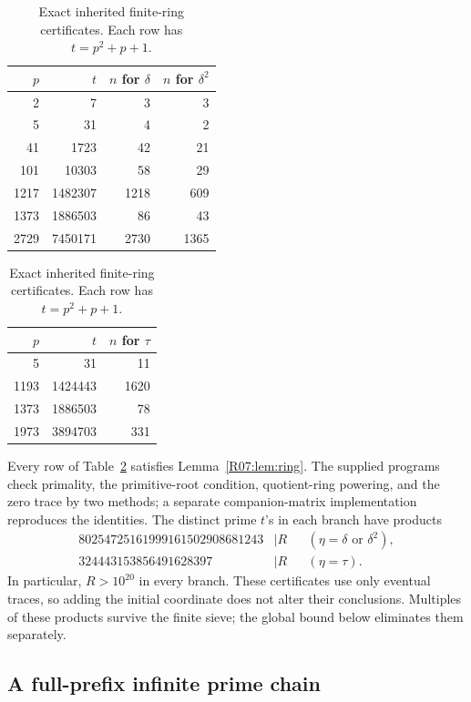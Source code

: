 \documentclass[11pt,a4paper]{article}
\theoremstyle{definition}\newtheorem{definition}[theorem]{Definition}
\theoremstyle{remark}\newtheorem{remark}[theorem]{Remark}
\begin{document}
\begin{table}[htbp]
\centering
\begin{tabular}{rrrr}
\toprule
$p$ & $t$ & $n$ for $\delta$ & $n$ for $\delta^2$\\
\midrule
2 & 7 & 3 & 3\\
5 & 31 & 4 & 2\\
41 & 1723 & 42 & 21\\
101 & 10303 & 58 & 29\\
1217 & 1482307 & 1218 & 609\\
1373 & 1886503 & 86 & 43\\
2729 & 7450171 & 2730 & 1365\\
\bottomrule
\end{tabular}
\qquad
\begin{tabular}{rrr}
\toprule
$p$ & $t$ & $n$ for $\tau$\\
\midrule
5 & 31 & 11\\
1193 & 1424443 & 1620\\
1373 & 1886503 & 78\\
1973 & 3894703 & 331\\
\bottomrule
\end{tabular}
\caption{Exact inherited finite-ring certificates. Each row has $t=p^2+p+1$.}
\label{R07:tab:divisors}
\end{table}

Every row of Table~\ref{R07:tab:divisors} satisfies Lemma~\ref{R07:lem:ring}.
The supplied programs check primality, the primitive-root condition,
quotient-ring powering, and the zero trace by two methods; a separate
companion-matrix implementation reproduces the identities.
The distinct prime $t$'s in each branch have products
\begin{align}
 80254725161999161502908681243&\mid R
                   &&(\eta=\delta\text{ or }\delta^2),\label{R07:eq:divdelta}\\
 324443153856491628397&\mid R
                   &&(\eta=\tau).\label{R07:eq:divtau}
\end{align}
In particular, $R>10^{20}$ in every branch.
These certificates use only eventual traces, so adding the initial
coordinate does not alter their conclusions. Multiples of these
products survive the finite sieve; the global bound below eliminates
them separately.

\subsection{A full-prefix infinite prime chain}\label{R07:sec:global}
\end{document}
